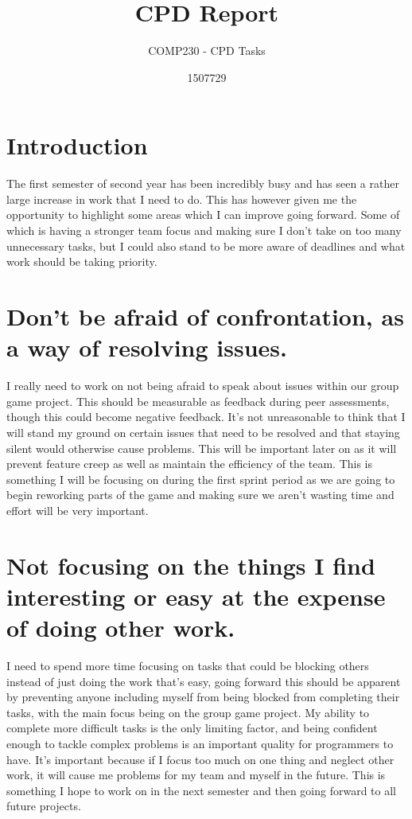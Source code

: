 \documentclass{scrartcl}
\title{CPD Report}
\subtitle{COMP230 - CPD Tasks}
\author{1507729}
\begin{document}
\maketitle

\section*{Introduction}

The first semester of second year has been incredibly busy and has seen a rather large increase in work that I need to do. This has however given me the opportunity to highlight some areas which I can improve going forward. Some of which is having a stronger team focus and making sure I don't take on too many unnecessary tasks, but I could also stand to be more aware of deadlines and what work should be taking priority.

\section{Don't be afraid of confrontation, as a way of resolving issues.}

I really need to work on not being afraid to speak about issues within our group game project. This should be measurable as feedback during peer assessments, though this could become negative feedback. It's not unreasonable to think that I will stand my ground on certain issues that need to be resolved and that staying silent would otherwise cause problems. This will be important later on as it will prevent feature creep as well as maintain the efficiency of the team. This is something I will be focusing on during the first sprint period as we are going to begin reworking parts of the game and making sure we aren't wasting time and effort will be very important.

\section{Not focusing on the things I find interesting or easy at the expense of doing other work.}

I need to spend more time focusing on tasks that could be blocking others instead of just doing the work that's easy, going forward this should be apparent by preventing anyone including myself from being blocked from completing their tasks, with the main focus being on the group game project. My ability to complete more difficult tasks is the only limiting factor, and being confident enough to tackle complex problems is an important quality for programmers to have. It's important because if I focus too much on one thing and neglect other work, it will cause me problems for my team and myself in the future. This is something I hope to work on in the next semester and then going forward to all future projects.
\end{document}
